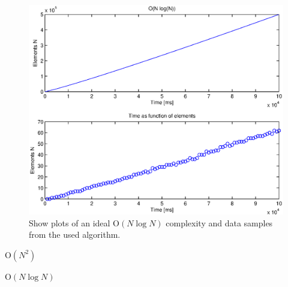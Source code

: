 \begin{figure}[th!]
\centering
\includegraphics[width=1\textwidth]{./graphics/test2.eps}
\caption{Show plots of an ideal O\(\left( N\log {N }  \right) \) complexity and data samples from the used algorithm.}
\label{fig:test2}
\end{figure}



O\(\left( { N }^{ 2 } \right)\)

O\(\left( N\log {N }  \right) \)
